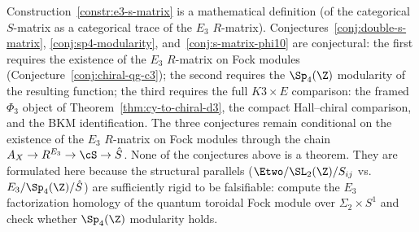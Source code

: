 \begin{remark}
\label{rem:e3-s-matrix-scope}
Construction~\ref{constr:e3-s-matrix} is a mathematical definition
(of the categorical $S$-matrix as a categorical trace of the
$E_3$ $R$-matrix). Conjectures~\ref{conj:double-s-matrix},
\ref{conj:sp4-modularity}, and~\ref{conj:s-matrix-phi10} are
conjectural: the first requires the existence of the $E_3$ $R$-matrix
on Fock modules (Conjecture~\ref{conj:chiral-qg-c3}); the second
requires the $\Sp_4(\Z)$ modularity of the resulting function;
the third requires the full $K3 \times E$ comparison: the framed
$\Phi_3$ object of Theorem~\ref{thm:cy-to-chiral-d3}, the compact
Hall--chiral comparison, and the BKM identification. The three
conjectures remain conditional on the existence of the $E_3$ $R$-matrix
on Fock modules through the chain $A_X \to R^{E_3} \to \cS \to \hat{S}$.
None of the conjectures above is a theorem. They are formulated
here because the structural parallels
($\Etwo/\SL_2(\Z)/S_{ij}$ vs.\ $E_3/\Sp_4(\Z)/\hat{S}$) are
sufficiently rigid to be falsifiable: compute the $E_3$ factorization
homology of the quantum toroidal Fock module over $\Sigma_2 \times S^1$
and check whether $\Sp_4(\Z)$ modularity holds.
\end{remark}

